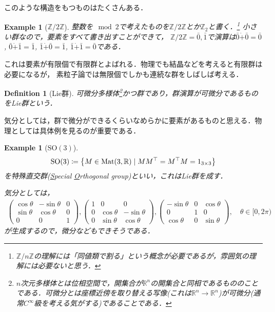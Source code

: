 \documentclass[dvipdfmx, a4paper, english]{jsarticle}
\theoremstyle{break}
\newtheorem{defn}[thm]{Definition}
\newtheorem{eg}[thm]{Example}
\newcommand{\R}{\mathbb{R}}
\newcommand{\Z}{\mathbb{Z}}
\newcommand{\Mat}{\mathrm{Mat}}
\newcommand{\SO}{\mathrm{SO}}
\numberwithin{equation}{section}
\begin{document}
	このような構造をもつものはたくさんある．

	\begin{eg}[$\Z/2\Z$]
			整数を$\mod 2$で考えたものを$\Z/2\Z$とか$\Z_2$と書く．\footnote{$\Z/n\Z$の理解には「同値類で割る」という概念が必要であるが，雰囲気の理解には必要ないと思う．}
			小さい群なので，要素をすべて書き出すことができて，
			$\Z/2\Z = {\bar{0}, \bar{1}}$で演算は$\bar{0} \dot{+} \bar{0} = \bar{0}$, $\bar{0} \dot{+} \bar{1} = \bar{1}$, $\bar{1} \dot{+} \bar{0} = \bar{1}$, $\bar{1} \dot{+} \bar{1} = \bar{0}$である．
	\end{eg}

	これは要素が有限個で有限群とよばれる．物理でも結晶などを考えると有限群は必要になるが，
	素粒子論では無限個でしかも連続な群をしばしば考える．
	
	\begin{defn}[Lie群]
			可微分多様体\footnote{$n$次元多様体とは位相空間で，開集合が$\R^n$の開集合と同相であるもののことである．可微分とは座標近傍を取り替える写像(これは$\R^n\to\R^n$)が可微分(通常$C^{\infty}$級を考える気がする)であることである．}かつ群であり，群演算が可微分であるものをLie群という．
	\end{defn}

	気分としては，群で微分ができるくらいなめらかに要素があるものと思える．物理としては具体例を見るのが重要である．

	\begin{eg}[$\SO(3)$]
			\begin{equation}
					\SO(3) \coloneqq \qty{M\in\Mat(3, \R)\mid MM^{\top} = M^{\top}M = 1_{3\times3}}
			\end{equation}
			を特殊直交群(\underline{S}pecial \underline{O}rthogonal group)といい，これはLie群を成す．

			気分としては，
			\begin{align}
					\begin{pmatrix}
							\cos\theta & -\sin\theta & 0\\
							\sin\theta & \cos\theta & 0\\
							0 & 0 & 1
					\end{pmatrix},
					\begin{pmatrix}
							1 & 0 & 0\\
							0 & \cos\theta &- \sin\theta\\
							0 & \sin\theta & \cos\theta
					\end{pmatrix}, 
					\begin{pmatrix}
							-\sin\theta & 0 & \cos\theta\\
							0 & 1 & 0 \\
							\cos\theta & 0 & \sin\theta
					\end{pmatrix},\quad \theta\in[0, 2\pi)
			\end{align}
			が生成するので，微分などもできそうである．
	\end{eg}
\end{document}
